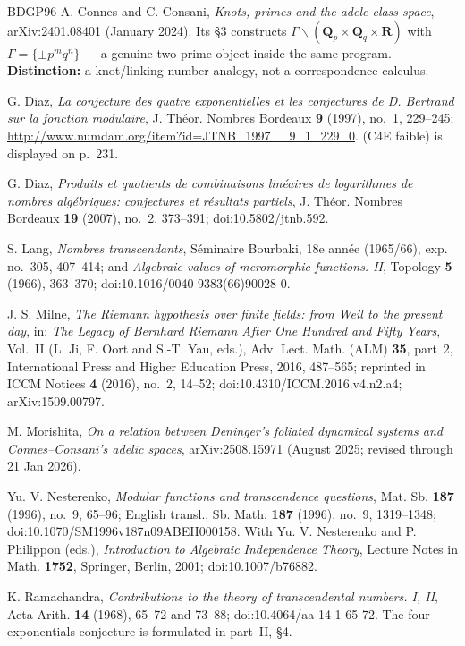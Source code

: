 \documentclass[11pt]{article}
\theoremstyle{definition}
\theoremstyle{remark}
\newcommand{\Q}{\mathbf{Q}}
\newcommand{\R}{\mathbf{R}}
\begin{document}
\begin{thebibliography}{BDGP96}
 A. Connes and C. Consani, \emph{Knots, primes and the
adele class space}, arXiv:2401.08401 (January 2024). Its \S3 constructs
$\Gamma \backslash (\Q_p \times \Q_q \times \R)$ with
$\Gamma = \{\pm p^m q^n\}$ --- a genuine two-prime object inside the same
program. \textbf{Distinction:} a knot/linking-number analogy, not a
correspondence calculus.

 G. Diaz, \emph{La conjecture des quatre exponentielles
et les conjectures de D. Bertrand sur la fonction modulaire},
J. Th\'eor. Nombres Bordeaux \textbf{9} (1997), no.~1, 229--245;
\url{http://www.numdam.org/item?id=JTNB_1997__9_1_229_0}. (C4E faible) is
displayed on p.~231.

 G. Diaz, \emph{Produits et quotients de combinaisons
lin\'eaires de logarithmes de nombres alg\'ebriques: conjectures et
r\'esultats partiels}, J. Th\'eor. Nombres Bordeaux \textbf{19} (2007),
no.~2, 373--391; doi:10.5802/jtnb.592.

 S. Lang, \emph{Nombres transcendants}, S\'eminaire
Bourbaki, 18e ann\'ee (1965/66), exp. no.~305, 407--414; and
\emph{Algebraic values of meromorphic functions. II}, Topology \textbf{5}
(1966), 363--370; doi:10.1016/0040-9383(66)90028-0.

 J. S. Milne, \emph{The Riemann hypothesis over finite
fields: from Weil to the present day}, in: \emph{The Legacy of Bernhard
Riemann After One Hundred and Fifty Years}, Vol.~II (L. Ji, F. Oort and
S.-T. Yau, eds.), Adv. Lect. Math. (ALM) \textbf{35}, part~2, International
Press and Higher Education Press, 2016, 487--565; reprinted in ICCM Notices
\textbf{4} (2016), no.~2, 14--52; doi:10.4310/ICCM.2016.v4.n2.a4;
arXiv:1509.00797.

 M. Morishita, \emph{On a relation between Deninger's
foliated dynamical systems and Connes--Consani's adelic spaces},
arXiv:2508.15971 (August 2025; revised through 21 Jan 2026).

 Yu. V. Nesterenko, \emph{Modular functions and
transcendence questions}, Mat. Sb. \textbf{187} (1996), no.~9, 65--96;
English transl., Sb. Math. \textbf{187} (1996), no.~9, 1319--1348;
doi:10.1070/SM1996v187n09ABEH000158. With Yu. V. Nesterenko and P. Philippon
(eds.), \emph{Introduction to Algebraic Independence Theory}, Lecture Notes in
Math. \textbf{1752}, Springer, Berlin, 2001; doi:10.1007/b76882.

 K. Ramachandra, \emph{Contributions to the theory of
transcendental numbers. I, II}, Acta Arith. \textbf{14} (1968), 65--72 and
73--88; doi:10.4064/aa-14-1-65-72. The four-exponentials conjecture is
formulated in part~II, \S4.


\end{thebibliography}
\end{document}
